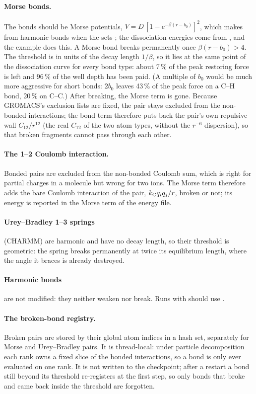 \paragraph{Morse bonds.}
The bonds should be Morse potentials, $V = D\,[1-e^{-\beta(r-b_0)}]^2$, which  makes from harmonic bonds when the  sets ; the dissociation
energies come from , and the example does this.
A Morse bond breaks permanently once $\beta(r-b_0) > 4$.
The threshold is in units of the decay length $1/\beta$, so it lies at the same point of the dissociation curve for
every bond type: about 7\,\% of the peak restoring force is left and 96\,\% of the well depth has been paid.
(A multiple of $b_0$ would be much more aggressive for short bonds: $2b_0$ leaves 43\,\% of the peak force on a C--H bond,
20\,\% on C--C.)
After breaking, the Morse term is gone.
Because GROMACS's exclusion lists are fixed, the pair stays excluded from the non-bonded interactions; the bond term
therefore puts back the pair's own repulsive wall $C_{12}/r^{12}$ (the real $C_{12}$ of the two atom types, without the
$r^{-6}$ dispersion), so that broken fragments cannot pass through each other.

\paragraph{The 1--2 Coulomb interaction.}
Bonded pairs are excluded from the non-bonded Coulomb sum, which is right for partial charges in a molecule but wrong for
two ions.
The Morse term therefore adds the bare Coulomb interaction of the pair, $k_{\mathrm C} q_iq_j/r$, broken or not; its energy is
reported in the Morse term of the energy file.

\paragraph{Urey--Bradley 1--3 springs} (CHARMM) are harmonic and have no decay length, so their threshold is
geometric: the spring breaks permanently at twice its equilibrium length, where the angle it braces is already
destroyed.

\paragraph{Harmonic bonds} are not modified: they neither weaken nor break.
Runs with  should use .

\paragraph{The broken-bond registry.}
Broken pairs are stored by their global atom indices in a hash set, separately for Morse and Urey--Bradley pairs.
It is thread-local: under particle decomposition each rank owns a fixed slice of the bonded interactions, so a bond
is only ever evaluated on one rank.
It is not written to the checkpoint; after a restart a bond still beyond its threshold re-registers at the first
step, so only bonds that broke and came back inside the threshold are forgotten.

